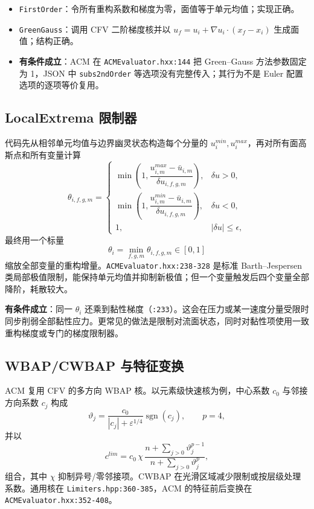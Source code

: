 \documentclass[UTF8,11pt,a4paper]{ctexart}
\newcommand{\statusconditional}{\textcolor{WarnOrange}{\textbf{有条件成立}}}
\newcommand{\code}[1]{\nolinkurl{#1}}
\begin{document}
\begin{itemize}
  \item \code{FirstOrder}：令所有重构系数和梯度为零，面值等于单元均值；实现正确。
  \item \code{GreenGauss}：调用 CFV 二阶梯度核并以 $u_f=u_i+\nabla u_i\cdot(x_f-x_i)$ 生成面值；结构正确。
  \item \statusconditional：ACM 在 \code{ACMEvaluator.hxx:144} 把 Green--Gauss 方法参数固定为 1，JSON 中 \code{subs2ndOrder} 等选项没有完整传入；其行为不是 Euler 配置选项的逐项等价复用。
\end{itemize}

\subsection{LocalExtrema 限制器}

代码先从相邻单元均值与边界幽灵状态构造每个分量的 $u_i^{min},u_i^{max}$，再对所有面高斯点和所有变量计算
\begin{equation}
 \theta_{i,f,g,m}=
 \begin{cases}
 \min\left(1,\dfrac{u_{i,m}^{max}-\bar u_{i,m}}{\delta u_{i,f,g,m}}\right),&\delta u>0,\\[0.6em]
 \min\left(1,\dfrac{u_{i,m}^{min}-\bar u_{i,m}}{\delta u_{i,f,g,m}}\right),&\delta u<0,\\
 1,&|\delta u|\le\epsilon,
 \end{cases}
\end{equation}
最终用一个标量
\begin{equation}
 \theta_i=\min_{f,g,m}\theta_{i,f,g,m}\in[0,1]
\end{equation}
缩放全部变量的重构增量。\code{ACMEvaluator.hxx:238-328} 是标准 Barth--Jespersen 类局部极值限制，能保持单元均值并抑制新极值；但一个变量触发后四个变量全部降阶，耗散较大。

\statusconditional：同一 $\theta_i$ 还乘到黏性梯度（\code{:233}）。这会在压力或某一速度分量受限时同步削弱全部黏性应力。更常见的做法是限制对流面状态，同时对黏性项使用一致重构梯度或专门的梯度限制器。

\subsection{WBAP/CWBAP 与特征变换}

ACM 复用 CFV 的多方向 WBAP 核。以元素级快速核为例，中心系数 $c_0$ 与邻接方向系数 $c_j$ 构成
\begin{equation}
 \vartheta_j=\frac{c_0}{|c_j|+\varepsilon^{1/4}}\operatorname{sgn}(c_j),\qquad p=4,
\end{equation}
并以
\begin{equation}
 c^{lim}=c_0\,\chi\,
 \frac{n+\sum_{j>0}\vartheta_j^{p-1}}
 {n+\sum_{j>0}\vartheta_j^{p}},
 \label{eq:wbap}
\end{equation}
组合，其中 $\chi$ 抑制异号/零邻接项。CWBAP 在光滑区域减少限制或按层级处理系数。通用核在 \code{Limiters.hpp:360-385}，ACM 的特征前后变换在 \code{ACMEvaluator.hxx:352-408}。
\end{document}
